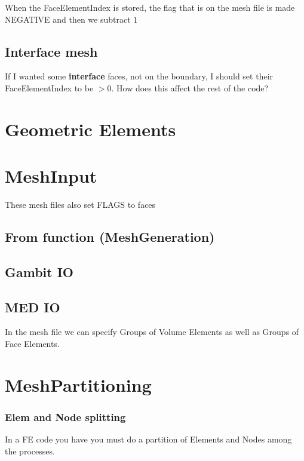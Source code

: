 \documentclass[10pt]{book}
\begin{document}
    When the FaceElementIndex is stored, the flag that is on the mesh file is made NEGATIVE and then we subtract $ 1 $
    
    \subsection{Interface mesh}
    
    If I wanted some \textbf{interface} faces, not on the boundary, I should set their FaceElementIndex to be $ > 0 $.
    How does this affect the rest of the code?
    
  
  \section{Geometric Elements}
  
  
  \section{MeshInput}

  These mesh files also set FLAGS to faces
  
    \subsection{From function (MeshGeneration)}
    
    \subsection{Gambit IO}
    
    \subsection{MED IO}
    
    In the mesh file we can specify Groups of Volume Elements as well as Groups of Face Elements.
    
    
    
  \section{MeshPartitioning}
  
  
  \subsubsection{Elem and Node splitting}
 
 In a FE code you have you must do a partition of Elements and Nodes among the processes.
\end{document}
